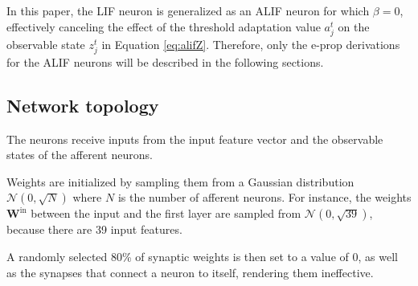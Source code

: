             In this paper, the LIF neuron is generalized as an ALIF neuron for which $\beta=0$, effectively canceling the effect of the threshold adaptation value $a^t_j$ on the observable state $z^t_j$ in Equation \ref{eq:alifZ}.
            Therefore, only the e-prop derivations for the ALIF neurons will be described in the following sections.

    \subsection{Network topology}

        The neurons receive inputs from the input feature vector and the observable states of the afferent neurons.

        Weights are initialized by sampling them from a Gaussian distribution $\mathcal{N}\left(0, \sqrt{N}\right)$ where $N$ is the number of afferent neurons.
        For instance, the weights $\mathbf{W}^\text{in}$ between the input and the first layer are sampled from $\mathcal{N}\left(0, \sqrt{39}\right)$, because there are 39 input features.

        A randomly selected 80\% of synaptic weights is then set to a value of 0, as well as the synapses that connect a neuron to itself, rendering them ineffective.

